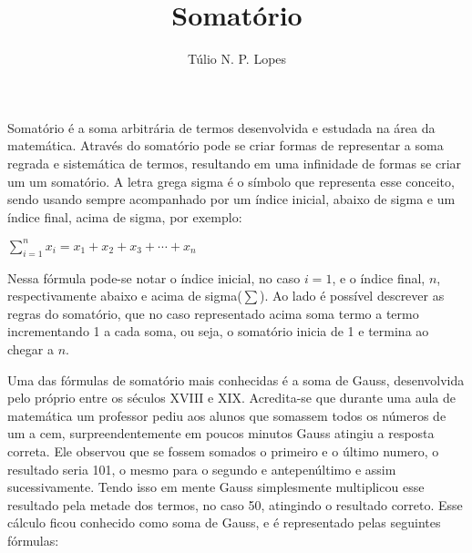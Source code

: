 \documentclass[12pt]{article}
\title{Somatório}
\author{Túlio N. P. Lopes\inst{1}}
\begin{document}
 
	
	\maketitle
	
	
	
	
	Somatório é a soma arbitrária de termos desenvolvida e estudada na área da matemática. Através do somatório pode se criar formas de representar a soma regrada e sistemática de termos, resultando em uma infinidade de formas se criar um um somatório. A letra grega sigma é o símbolo que representa esse conceito, sendo usando sempre acompanhado por um índice inicial, abaixo de sigma e um índice final, acima de sigma, por exemplo:
	
	$\sum_{i=1}^{n}{x_i} = x_1+x_2+x_3+ \cdots +x_n $
	
	Nessa fórmula pode-se notar o índice inicial, no caso $i = 1$, e o índice final, $n$, respectivamente abaixo e acima de sigma($\sum$). Ao lado é possível descrever as regras do somatório, que no caso representado acima soma termo a termo incrementando 1 a cada soma, ou seja, o somatório inicia de 1 e termina ao chegar a $n$.
	
	Uma das fórmulas de somatório mais conhecidas é a soma de Gauss, desenvolvida pelo próprio entre os séculos XVIII e XIX. Acredita-se que durante uma aula de matemática um professor pediu aos alunos que somassem todos os números de um a cem, surpreendentemente em poucos minutos Gauss atingiu a resposta correta. Ele observou que se fossem somados o primeiro e o último numero, o resultado seria 101, o mesmo para o segundo e antepenúltimo e assim sucessivamente. Tendo isso em mente Gauss simplesmente multiplicou esse resultado pela metade dos termos, no caso 50, atingindo o resultado correto. Esse cálculo ficou conhecido como soma de Gauss, e é representado pelas seguintes fórmulas:
	
\end{document}
